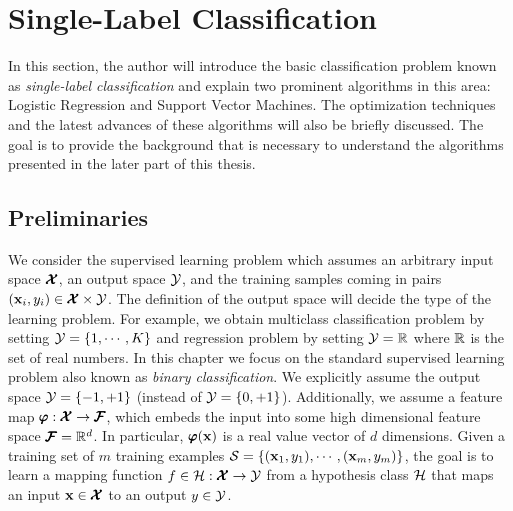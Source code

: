 %
\section{Single-Label Classification}\label{sc_slc}

In this section, the author will introduce the basic classification problem known as \textit{single-label classification} and explain two prominent algorithms in this area: Logistic Regression and Support Vector Machines.
The optimization techniques and the latest advances of these algorithms will also be briefly discussed.
The goal is to provide the background that is necessary to understand the algorithms presented in the later part of this thesis. 



%
%
\subsection{Preliminaries}\label{sc_slc_pn}

We consider the supervised learning problem which assumes an arbitrary input space $\pmb {\mathcal{X}}$, an output space $\mathcal{Y}$, and the training samples coming in pairs $(\mathbf {x}_i,y_i)\in\pmb {\mathcal{X}}\times\mathcal{Y}$.
The definition of the output space will decide the type of the learning problem.
For example, we obtain multiclass classification problem by setting $\mathcal{Y}=\{1,\cdots,K\}$ and regression problem by setting $\mathcal{Y}=\mathbb{R}$ where $\mathbb{R}$ is the set of real numbers.
In this chapter we focus on the standard supervised learning problem also known as \textit{binary classification}.
We explicitly assume the output space $\mathcal{Y}=\{-1,+1\}$ (instead of $\mathcal{Y}=\{0,+1\}$).
Additionally, we assume a feature map $\pmb \varphi:\pmb {\mathcal{X}}\rightarrow\pmb {\mathcal{F}}$, which embeds the input into some high dimensional feature space $\pmb {\mathcal{F}}=\mathbb{R}^d$.
In particular, $\pmb \varphi(\mathbf {x})$ is a real value vector of $d$ dimensions.
Given a training set of $m$ training examples $\mathcal{S}=\{(\mathbf {x}_1,y_1),\cdots,(\mathbf {x}_m,y_m)\}$, the goal is to learn a mapping function $f\in\mathcal{H}:\pmb {\mathcal{X}}\rightarrow\mathcal{Y}$ from a {hypothesis class} $\mathcal{H}$ that maps an input $\mathbf {x}\in\pmb {\mathcal{X}}$ to an output $y\in\mathcal{Y}$. 

